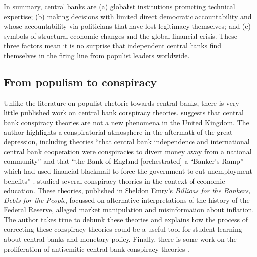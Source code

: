 \documentclass[11pt]{article}
\begin{document}
In summary, central banks are (a) globalist institutions promoting technical expertise; (b) making decisions with limited direct democratic accountability and whose accountability via politicians that have lost legitimacy themselves; and (c) symbols of structural economic changes and the global financial crisis. These three factors mean it is no surprise that independent central banks find themselves in the firing line from populist leaders worldwide.

\subsection{From populism to conspiracy} \label{subsection: From populism to conspiracy}

Unlike the literature on populist rhetoric towards central banks, there is very little published work on central bank conspiracy theories. \cite{james2010central} suggests that central bank conspiracy theories are not a new phenomena in the United Kingdom. The author highlights a conspiratorial atmosphere in the aftermath of the great depression, including theories ``that central bank independence and international central bank cooperation were conspiracies to divert money away from a national community''  and that ``the Bank of England [orchestrated] a “Banker’s Ramp” which had used financial blackmail to force the government to cut unemployment benefits'' \citep[pg.~12]{james2010central}. \cite{tokle2005fed} studied several conspiracy theories in the context of economic education. These theories, published in Sheldon Emry's \textit{Billions for the Bankers, Debts for the People}, focussed on alternative interpretations of the history of the Federal Reserve, alleged market manipulation and misinformation about inflation. The author takes time to debunk these theories and explains how the process of correcting these conspiracy theories could be a useful tool for student learning about central banks and monetary policy. Finally, there is some work on the proliferation of antisemitic central bank conspiracy theories \citep[for example]{league2017jewish}.
\end{document}
